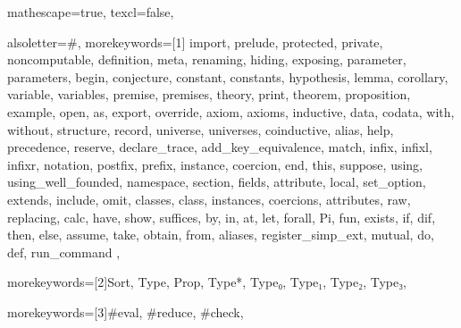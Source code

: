 
 {

mathescape=true,
texcl=false,

alsoletter={\#},
morekeywords=[1]{
import, prelude, protected, private, noncomputable, definition, meta, renaming,
hiding, exposing, parameter, parameters, begin, conjecture, constant, constants,
hypothesis, lemma, corollary, variable, variables, premise, premises, theory,
print, theorem, proposition, example,
open, as, export, override, axiom, axioms, inductive, data, codata, with, without,
structure, record, universe, universes, coinductive,
alias, help, precedence, reserve, declare_trace, add_key_equivalence,
match, infix, infixl, infixr, notation, postfix, prefix, instance,
coercion, end, this, suppose,
using, using_well_founded, namespace, section, fields,
attribute, local, set_option, extends, include, omit, classes, class,
instances, coercions, attributes, raw, replacing,
calc, have, show, suffices, by, in, at, let, forall, Pi, fun,
exists, if, dif, then, else, assume, take, obtain, from, aliases, register_simp_ext,
mutual, do, def, run_command
},

morekeywords=[2]{Sort, Type, Prop, Type*, Type₀, Type₁, Type₂, Type₃},

morekeywords=[3]{\#eval, \#reduce, \#check},


}
